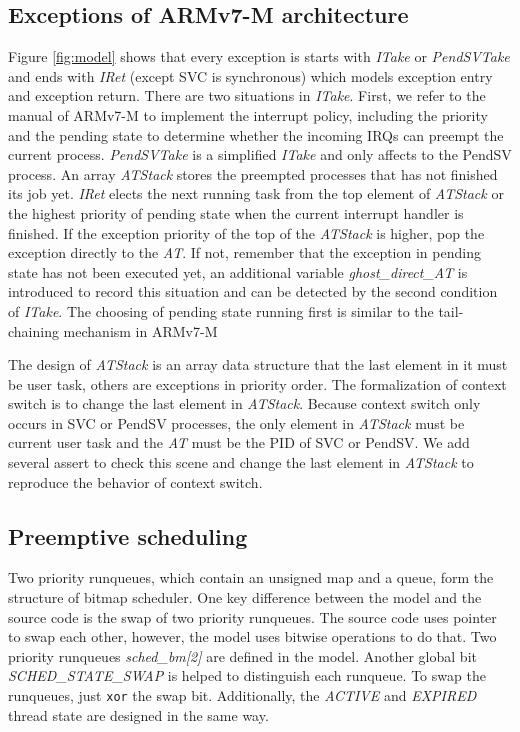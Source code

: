 \subsection{Exceptions of ARMv7-M architecture}
Figure \ref{fig:model} shows that every exception is starts with \textit{ITake} or \textit{PendSVTake} and ends with \textit{IRet} (except SVC is synchronous) which models exception entry and exception return. There are two situations in \textit{ITake}. First, we refer to the manual of ARMv7-M to implement the interrupt policy, including the priority and the pending state to determine whether the incoming IRQs can preempt the current process. \textit{PendSVTake} is a simplified \textit{ITake} and only affects to the PendSV process. An array \textit{ATStack} stores the preempted processes that has not finished its job yet. \textit{IRet} elects the next running task from the top element of \textit{ATStack} or the highest priority of pending state when the current interrupt handler is finished. If the exception priority of the top of the \textit{ATStack} is higher, pop the exception directly to the \textit{AT}. If not, remember that the exception in pending state has not been executed yet, an additional variable \textit{ghost\_direct\_AT} is introduced to record this situation and can be detected by the second condition of \textit{ITake}. The choosing of pending state running first is similar to the tail-chaining mechanism in ARMv7-M

The design of \textit{ATStack} is an array data structure that the last element in it must be user task, others are exceptions in priority order. The formalization of context switch is to change the last element in \textit{ATStack}. Because context switch only occurs in SVC or PendSV processes, the only element in \textit{ATStack} must be current user task and the \textit{AT} must be the PID of SVC or PendSV. We add several assert to check this scene and change the last element in \textit{ATStack} to reproduce the behavior of context switch.

\subsection{Preemptive scheduling}
Two priority runqueues, which contain an unsigned map and a queue, form the structure of bitmap scheduler. One key difference between the model and the source code is the swap of two priority runqueues. The source code uses pointer to swap each other, however, the model uses bitwise operations to do that. Two priority runqueues \textit{sched\_bm[2]} are defined in the model. Another global bit \textit{SCHED\_STATE\_SWAP} is helped to distinguish each runqueue. To swap the runqueues, just \texttt{xor} the swap bit. Additionally, the \textit{ACTIVE} and \textit{EXPIRED} thread state are designed in the same way.


